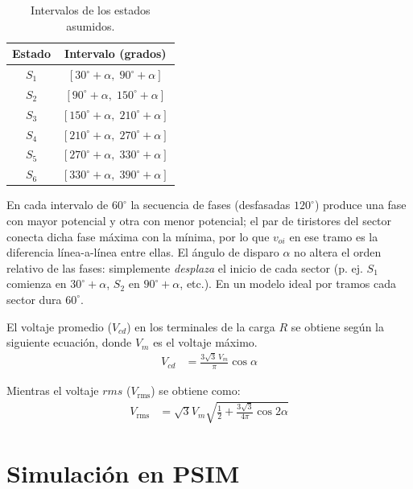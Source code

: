 \documentclass[conference]{IEEEtran}
\begin{document}

\begin{table}[h!]
	\centering
	\small
	\begin{tabular}{@{}cc@{}}
		\toprule
		Estado & Intervalo (grados) \\ \midrule
	    $S_{1}$ & $[30^\circ+\alpha,\;90^\circ+\alpha]$ \\
		$S_{2}$ & $[90^\circ+\alpha,\;150^\circ+\alpha]$ \\
		$S_{3}$ & $[150^\circ+\alpha,\;210^\circ+\alpha]$ \\
		$S_{4}$ & $[210^\circ+\alpha,\;270^\circ+\alpha]$ \\
		$S_{5}$ & $[270^\circ+\alpha,\;330^\circ+\alpha]$ \\
		$S_{6}$ & $[330^\circ+\alpha,\;390^\circ+\alpha]$ \\ \bottomrule
	\end{tabular}
	\caption{Intervalos de los estados asumidos.}
	
	\label{tab:estados_grados}
\end{table}

En cada intervalo de $60^\circ$ la secuencia de fases (desfasadas $120^\circ$) produce una fase 
con mayor potencial y otra con menor potencial; el par de tiristores del sector conecta dicha fase 
máxima con la mínima, por lo que $v_{oi}$ en ese tramo es la diferencia línea-a-línea entre ellas. 
El ángulo de disparo $\alpha$ no altera el orden relativo de las fases: simplemente \emph{desplaza} el inicio de cada sector (p. ej. $S_{1}$ comienza en $30^\circ+\alpha$, 
$S_{2}$ en $90^\circ+\alpha$, etc.). En un modelo ideal por tramos cada sector dura $60^\circ$.

El voltaje promedio ($V_{cd}$) en los terminales de la carga $R$ se obtiene según la siguiente ecuación, donde $V_m$ es el voltaje máximo.
\begin{align*}	
    V_{cd} &= \frac{3\sqrt{3}\,V_m}{\pi} \cos\alpha	
\end{align*}

Mientras el voltaje $rms$ ($V_{\text{rms}}$) se obtiene como:
\begin{align*}	
    V_{\text{rms}} &= \sqrt{3}V_m\sqrt{\frac{1}{2} + \frac{3\sqrt{3}}{4\pi} \cos 2\alpha}
\end{align*}


\section{Simulación en PSIM}
\end{document}
